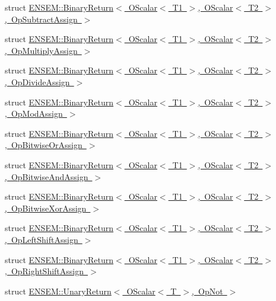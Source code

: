 \begin{DoxyCompactItemize}
\item 
struct \mbox{\hyperlink{structENSEM_1_1BinaryReturn_3_01OScalar_3_01T1_01_4_00_01OScalar_3_01T2_01_4_00_01OpSubtractAssign_01_4}{E\+N\+S\+E\+M\+::\+Binary\+Return$<$ O\+Scalar$<$ T1 $>$, O\+Scalar$<$ T2 $>$, Op\+Subtract\+Assign $>$}}
\item 
struct \mbox{\hyperlink{structENSEM_1_1BinaryReturn_3_01OScalar_3_01T1_01_4_00_01OScalar_3_01T2_01_4_00_01OpMultiplyAssign_01_4}{E\+N\+S\+E\+M\+::\+Binary\+Return$<$ O\+Scalar$<$ T1 $>$, O\+Scalar$<$ T2 $>$, Op\+Multiply\+Assign $>$}}
\item 
struct \mbox{\hyperlink{structENSEM_1_1BinaryReturn_3_01OScalar_3_01T1_01_4_00_01OScalar_3_01T2_01_4_00_01OpDivideAssign_01_4}{E\+N\+S\+E\+M\+::\+Binary\+Return$<$ O\+Scalar$<$ T1 $>$, O\+Scalar$<$ T2 $>$, Op\+Divide\+Assign $>$}}
\item 
struct \mbox{\hyperlink{structENSEM_1_1BinaryReturn_3_01OScalar_3_01T1_01_4_00_01OScalar_3_01T2_01_4_00_01OpModAssign_01_4}{E\+N\+S\+E\+M\+::\+Binary\+Return$<$ O\+Scalar$<$ T1 $>$, O\+Scalar$<$ T2 $>$, Op\+Mod\+Assign $>$}}
\item 
struct \mbox{\hyperlink{structENSEM_1_1BinaryReturn_3_01OScalar_3_01T1_01_4_00_01OScalar_3_01T2_01_4_00_01OpBitwiseOrAssign_01_4}{E\+N\+S\+E\+M\+::\+Binary\+Return$<$ O\+Scalar$<$ T1 $>$, O\+Scalar$<$ T2 $>$, Op\+Bitwise\+Or\+Assign $>$}}
\item 
struct \mbox{\hyperlink{structENSEM_1_1BinaryReturn_3_01OScalar_3_01T1_01_4_00_01OScalar_3_01T2_01_4_00_01OpBitwiseAndAssign_01_4}{E\+N\+S\+E\+M\+::\+Binary\+Return$<$ O\+Scalar$<$ T1 $>$, O\+Scalar$<$ T2 $>$, Op\+Bitwise\+And\+Assign $>$}}
\item 
struct \mbox{\hyperlink{structENSEM_1_1BinaryReturn_3_01OScalar_3_01T1_01_4_00_01OScalar_3_01T2_01_4_00_01OpBitwiseXorAssign_01_4}{E\+N\+S\+E\+M\+::\+Binary\+Return$<$ O\+Scalar$<$ T1 $>$, O\+Scalar$<$ T2 $>$, Op\+Bitwise\+Xor\+Assign $>$}}
\item 
struct \mbox{\hyperlink{structENSEM_1_1BinaryReturn_3_01OScalar_3_01T1_01_4_00_01OScalar_3_01T2_01_4_00_01OpLeftShiftAssign_01_4}{E\+N\+S\+E\+M\+::\+Binary\+Return$<$ O\+Scalar$<$ T1 $>$, O\+Scalar$<$ T2 $>$, Op\+Left\+Shift\+Assign $>$}}
\item 
struct \mbox{\hyperlink{structENSEM_1_1BinaryReturn_3_01OScalar_3_01T1_01_4_00_01OScalar_3_01T2_01_4_00_01OpRightShiftAssign_01_4}{E\+N\+S\+E\+M\+::\+Binary\+Return$<$ O\+Scalar$<$ T1 $>$, O\+Scalar$<$ T2 $>$, Op\+Right\+Shift\+Assign $>$}}
\item 
struct \mbox{\hyperlink{structENSEM_1_1UnaryReturn_3_01OScalar_3_01T_01_4_00_01OpNot_01_4}{E\+N\+S\+E\+M\+::\+Unary\+Return$<$ O\+Scalar$<$ T $>$, Op\+Not $>$}}

\end{DoxyCompactItemize}
